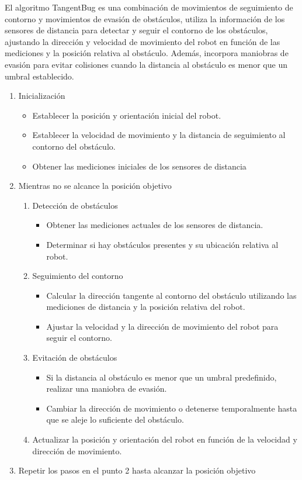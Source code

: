 \documentclass{article}
\begin{document}
\begin{itemize}
  El algoritmo TangentBug es una combinación de movimientos de seguimiento de contorno y movimientos de evasión de obstáculos, utiliza la información de los sensores de distancia para detectar y seguir el contorno de los obstáculos, ajustando la dirección y velocidad de movimiento del robot en función de las mediciones y la posición relativa al obstáculo. Además, incorpora maniobras de evasión para evitar colisiones cuando la distancia al obstáculo es menor que un umbral establecido.

  \begin{enumerate}
  \item Inicialización
    \begin{itemize}
    \item Establecer la posición y orientación inicial del robot.
    \item Establecer la velocidad de movimiento y la distancia de seguimiento al contorno del obstáculo.
    \item Obtener las mediciones iniciales de los sensores de distancia
    \end{itemize}
  \item Mientras no se alcance la posición objetivo
    \begin{enumerate}
    \item Detección de obstáculos
      \begin{itemize}
      \item Obtener las mediciones actuales de los sensores de distancia.
      \item Determinar si hay obstáculos presentes y su ubicación relativa al robot.
      \end{itemize}
    \item Seguimiento del contorno
      \begin{itemize}
      \item Calcular la dirección tangente al contorno del obstáculo utilizando las mediciones de distancia y la posición relativa del robot.
      \item Ajustar la velocidad y la dirección de movimiento del robot para seguir el contorno.
      \end{itemize}
    \item Evitación de obstáculos
      \begin{itemize}
      \item Si la distancia al obstáculo es menor que un umbral predefinido, realizar una maniobra de evasión.
      \item Cambiar la dirección de movimiento o detenerse temporalmente hasta que se aleje lo suficiente del obstáculo.
      \end{itemize}
    \item Actualizar la posición y orientación del robot en función de la velocidad y dirección de movimiento.
    \end{enumerate}
  \item Repetir los pasos en el punto 2 hasta alcanzar la posición objetivo
  \end{enumerate}
  
\end{itemize}

\end{document}
